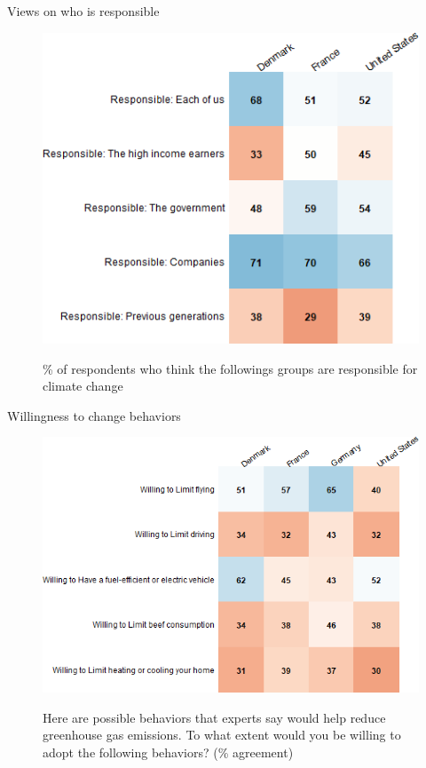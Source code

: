 \documentclass[aspectratio=169,9pt,dvipsnames]{beamer}
\begin{document}
\begin{frame}{Views on who is responsible }%
\begin{figure}[h!]
\centering
\caption{\% of respondents who think the followings groups are responsible for climate change}
\includegraphics[width=.59\textwidth]{../figures/country_comparison/responsible_CC_positive_countries.png} \\
\end{figure}
\end{frame}


\begin{frame}{Willingness to change behaviors}%
\begin{figure}[h!]
\centering
\caption{Here are possible behaviors that experts say would help reduce greenhouse gas emissions.
To what extent would you be willing to adopt the following behaviors? (\% agreement)}
\includegraphics[width=.6\textwidth]{../figures/country_comparison/willing_positive_countries.png} \\
\end{figure}
\end{frame}
\end{document}
